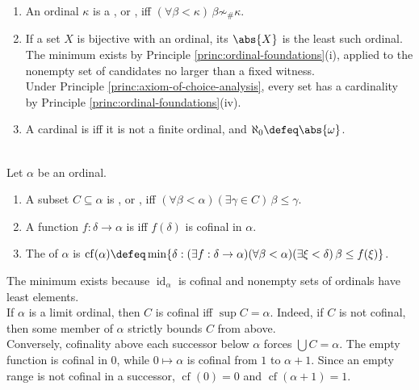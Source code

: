 \begin{definition} \label{def:cardinals-as-initial-ordinals} 
\begin{enumerate}[label=(\roman*)]
\setlength{\itemsep}{0pt}
\item An ordinal $\kappa$ is a , or , iff $(\forall\beta<\kappa)\,\beta\not\sim_{\#}\kappa$.
\item If a set $X$ is bijective with an ordinal, its  $\abs{X}$ is the least such ordinal.\\
The minimum exists by Principle \ref{princ:ordinal-foundations}(i), applied to the nonempty set of candidates no larger than a fixed witness.\\
Under Principle \ref{princ:axiom-of-choice-analysis}, every set has a cardinality by Principle \ref{princ:ordinal-foundations}(iv).
\item A cardinal is  iff it is not a finite ordinal, and $\aleph_0\defeq\abs{\omega}$.
\end{enumerate}
\end{definition}

\begin{definition} \label{def:cofinal-subsets-and-cofinality} \\
Let $\alpha$ be an ordinal.
\begin{enumerate}[label=(\roman*)]
\setlength{\itemsep}{0pt}
\item A subset $C\subseteq\alpha$ is , or , iff $(\forall\beta<\alpha)(\exists\gamma\in C)\,\beta\leq\gamma$.
\item A function $f:\delta\to\alpha$ is  iff $f(\delta)$ is cofinal in $\alpha$.
\item The  of $\alpha$ is $\operatorname{cf}(\alpha)\defeq\min\{\delta:(\exists f:\delta\to\alpha)(\forall\beta<\alpha)(\exists\xi<\delta)\,\beta\leq f(\xi)\}$.
\end{enumerate}
The minimum exists because $\operatorname{id}_{\alpha}$ is cofinal and nonempty sets of ordinals have least elements.\\
If $\alpha$ is a limit ordinal, then $C$ is cofinal iff $\sup C=\alpha$. Indeed, if $C$ is not cofinal, then some member of $\alpha$ strictly bounds $C$ from above.\\
Conversely, cofinality above each successor below $\alpha$ forces $\bigcup C=\alpha$. The empty function is cofinal in $0$, while $0\mapsto\alpha$ is cofinal from $1$ to $\alpha+1$. Since an empty range is not cofinal in a successor, $\operatorname{cf}(0)=0$ and $\operatorname{cf}(\alpha+1)=1$.
\end{definition}

